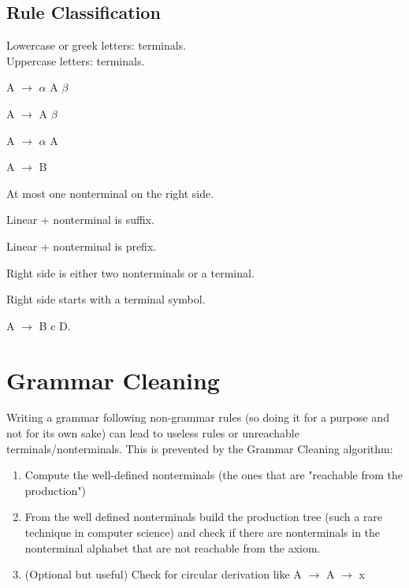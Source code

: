 		\subsection{Rule Classification}
			Lowercase or greek letters: terminals.\\
			Uppercase letters: terminals.
			\begin{definition}[Recursive]
				A $\rightarrow$ $\alpha$ A $\beta$ 
			\end{definition}
			\begin{definition}
				A $\rightarrow$ A $\beta$ 
			\end{definition}
			\begin{definition}
				A $\rightarrow$ $\alpha$ A
			\end{definition}
			\begin{definition}[Copy]
				A $\rightarrow$ B
			\end{definition}
			\begin{definition}[Linear]
				At most one nonterminal on the right side.
			\end{definition}
			\begin{definition}
				Linear + nonterminal is suffix.
			\end{definition}
			\begin{definition}
				Linear + nonterminal is prefix.
			\end{definition}
			\begin{definition}[Chomsky]
				Right side is either two nonterminals or a terminal.
			\end{definition}
			\begin{definition}
				Right side starts with a terminal symbol.
			\end{definition}
			\begin{definition}
				A $\rightarrow$ B c D.
			\end{definition}
    \section{Grammar Cleaning}
        Writing a grammar following non-grammar rules (so doing it for a purpose and not for its own sake) can lead to useless rules or unreachable terminals/nonterminals. This is prevented by the Grammar Cleaning algorithm:
            \begin{enumerate}
                \item Compute the well-defined nonterminals (the ones that are "reachable from the production")
                \item From the well defined nonterminals build the production tree (such a rare technique in computer science) and check if there are nonterminals in the nonterminal alphabet that are not reachable from the axiom.
                \item (Optional but useful) Check for circular derivation like A $\rightarrow$ A $\rightarrow$ x
            \end{enumerate}
    
